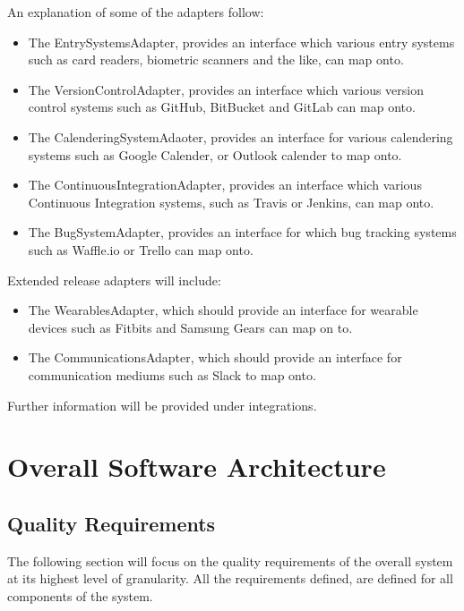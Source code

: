 \documentclass[11pt,a4paper]{article}
\begin{document}
An explanation of some of the adapters follow:
\begin{itemize}
	\item The EntrySystemsAdapter, provides an interface which various entry systems such as card readers, biometric scanners and the like, can map onto.
	\item The VersionControlAdapter, provides an interface which various version control systems such as GitHub, BitBucket and GitLab can map onto.
	\item The CalenderingSystemAdaoter, provides an interface for various calendering systems such as Google Calender, or Outlook calender to map onto.
	\item The ContinuousIntegrationAdapter, provides an interface which various Continuous Integration systems, such as Travis or Jenkins, can map onto.
	\item The BugSystemAdapter, provides an interface for which bug tracking systems such as Waffle.io or Trello can map onto.\\
\end{itemize}
Extended release adapters will include:
\begin{itemize}
	\item The WearablesAdapter, which should provide an interface for wearable devices such as Fitbits and Samsung Gears can map on to.
	\item The CommunicationsAdapter, which should provide an interface for communication mediums such as Slack to map onto.\\
\end{itemize}
Further information will be provided under integrations.

\section{Overall Software Architecture}

\subsection{Quality Requirements}
The following section will focus on the quality requirements of the overall system at its highest level of granularity. All the requirements defined, are defined for all components of the system.
\end{document}
